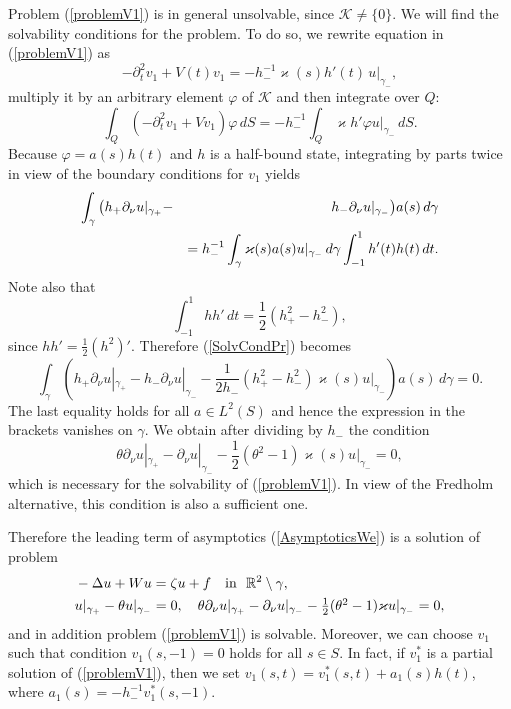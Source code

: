 \documentclass[graybox]{svmult}
\renewcommand{\kappa}{\varkappa}
\newcommand{\Real}{\mathbb R}
\renewcommand{\phi}{\varphi}
\newcommand{\eqref}[1]{(\ref{#1})}
\newcommand{\pte}{\partial_t}
\begin{document}
Problem \eqref{problemV1} is in general unsolvable, since $\mathcal{K}\neq\{0\}$. We will find the solvabi\-li\-ty conditions for the problem. To do so, we rewrite  equation in \eqref{problemV1} as
$$
  -\pte^2 v_1+V(t)v_1=- h_-^{-1}\kappa(s)h'(t)\,u|_{\gamma_-},
$$
multiply it by an arbitrary element $\phi$ of  $\mathcal{K}$  and then integrate over $Q$:
$$
\int_{Q}\left(-\pte^2 v_1+Vv_1\right)\phi\,dS=
-h_-^{-1}\int_{Q}\kappa h' \phi u|_{\gamma_-}\,dS.
$$
Because $\phi=a(s)h(t)$ and $h$ is a half-bound state, integrating by parts twice  in view of the boundary conditions for $v_1$ yields
\begin{eqnarray}\nonumber
\int_{\gamma}\big(h_+\partial_\nu u|_{\gamma_+}-&&\kern-4pt h_-\partial_\nu u|_{\gamma_-}\big) a(s)\,d\gamma\\\label{SolvCondPr}
&&=h_-^{-1} \int_{\gamma}\kappa(s)a(s)u|_{\gamma_-}\,d\gamma
\int_{-1}^1h'(t)h(t)\,d t.
\end{eqnarray}
Note also that
$$
  \int_{-1}^1hh'\,d t=\frac12 \left(h_+^2-h_-^2\right),
$$
since $hh'=\frac12 (h^2)'$. Therefore \eqref{SolvCondPr} becomes
$$
\int_{\gamma}\left(h_+\partial_\nu u|_{\gamma_+}-h_-\partial_\nu u|_{\gamma_-}
-\frac{1}{2 h_-}(h_+^2-h_-^2)\kappa(s)u|_{\gamma_-}\right)a(s)\,d\gamma= 0.
$$
The last equality holds for all $a\in L^2(S)$ and hence  the expression in the brackets vanishes on $\gamma$. We obtain after dividing by $h_-$ the  condition
\begin{equation}\label{RCond1}
  \theta\partial_\nu u|_{\gamma_+}-\partial_\nu u|_{\gamma_-}
-\textstyle\frac{1}{2 }(\theta^2-1) \kappa(s) u|_{\gamma_-}=0,
\end{equation}
which is necessary for the solvability of \eqref{problemV1}.
In view of the Fredholm alternative, this condition is also a sufficient one.

Therefore the leading term of asymptotics \eqref{AsymptoticsWe} is a solution of problem
\begin{eqnarray}\label{LimitProblemEq}
&-\Delta u+Wu=\zeta u+f \quad \hbox{in \ } \Real^2\setminus \gamma,\\\label{LimitProblemCnds}
 &u|_{\gamma_+}-\theta u|_{\gamma_-}=0,\quad  \theta\partial_\nu u|_{\gamma_+}-\partial_\nu u|_{\gamma_-}
-\textstyle\frac{1}{2 }(\theta^2-1) \kappa u|_{\gamma_-}=0,
\end{eqnarray}
and in addition problem \eqref{problemV1} is solvable. Moreover, we can choose $v_1$ such that condition $v_1(s,-1)=0$ holds for all $s\in S$.
In fact, if $v_1^*$ is a partial solution of \eqref{problemV1}, then we set $v_1(s,t)=v_1^*(s,t)+a_1(s)h(t)$,
where $a_1(s)=-h_-^{-1}v_1^*(s,-1)$.
\end{document}

